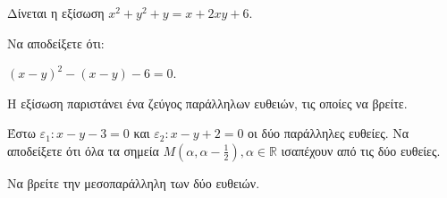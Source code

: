 Δίνεται η εξίσωση $x^2+y^2+y=x+2xy+6$.
\begin{alist}
\item Να αποδείξετε ότι:
    \begin{rlist}
    \item $(x-y)^2-(x-y)-6=0$. 
    \item Η εξίσωση παριστάνει ένα ζεύγος παράλληλων ευθειών, τις οποίες να βρείτε. 
    \end{rlist}
\item Έστω $\varepsilon_1: x-y-3=0$ και $\varepsilon_2: x-y+2=0$ οι δύο παράλληλες ευθείες. Να αποδείξετε ότι όλα τα σημεία $M\left(\alpha, \alpha-\frac{1}{2}\right), \alpha \in \mathbb{R}$ ισαπέχουν από τις δύο ευθείες. 
\item Να βρείτε την μεσοπαράλληλη των δύο ευθειών. 
\end{alist}